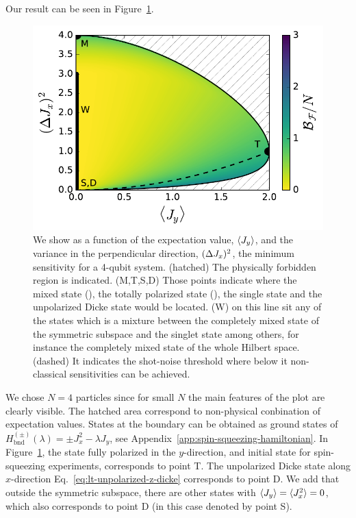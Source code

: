 Our result can be seen in Figure~\ref{fig:lt-spsq2d-4}.
\begin{figure}
  \centering
  \includegraphics[scale=.65]{img/plots/LT_spsq2d_4.pdf}
  \caption[Solution for 4 particle on the paramenter region for spin-squeezed states.]{We show as a function of the expectation value, $\langle J_y \rangle$, and the variance in the perpendicular direction, $(\Delta J_x )^2$, the minimum sensitivity for a 4-qubit system.
  (hatched) The physically forbidden region is indicated. (M,T,S,D) Those points indicate where the mixed state (), the totally polarized state (), the single state and the unpolarized Dicke state would be located. (W) on this line sit any of the states which is a mixture between the completely mixed state of the symmetric subspace and the singlet state among others, for instance the completely mixed state of the whole Hilbert space. (dashed) It indicates the shot-noise threshold where below it non-classical sensitivities can be achieved.}
  \label{fig:lt-spsq2d-4}
\end{figure}
We chose $N=4$ particles since for small $N$ the main features of the plot are clearly visible.
The hatched area correspond to non-physical conbination of expectation values.
States at the boundary can be obtained as ground states of $H_{\text{bnd}}^{(\pm)}(\lambda)=\pm J_x^2 -\lambda J_y$, see Appendix~\ref{app:spin-squeezing-hamiltonian}.
In Figure~\ref{fig:lt-spsq2d-4}, the state fully polarized in the $y$-direction, and initial state for spin-squeezing experiments, corresponds to point T.
The unpolarized Dicke state along $x$-direction Eq.~\eqref{eq:lt-unpolarized-z-dicke} corresponds to point D.
We add that outside the symmetric subspace, there are other states with $\langle J_y \rangle=\langle J_x^2 \rangle=0$, which also corresponds to point D (in this case denoted by point S).
